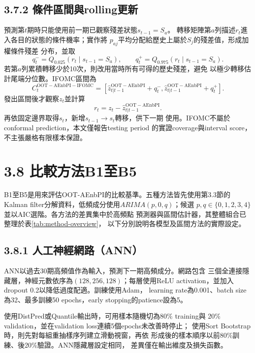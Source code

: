 \subsection*{3.7.2 條件區間與rolling更新}

預測第$t$期時只能使用前一期已觀察殘差狀態$s_{t-1}=S_a$。
轉移矩陣第$a$列描述$r_t$進入各目的狀態的條件機率；實作將
$p_{aj}$平均分配給歷史上屬於$S_j$的殘差值，形成加權條件殘差
分布，並取
\begin{equation}
 q_t^-=Q_{0.025}(r_t\mid s_{t-1}=S_a),\qquad
 q_t^+=Q_{0.975}(r_t\mid s_{t-1}=S_a).
\end{equation}
若第$a$列累積轉移少於10次，則改用當時所有可得的歷史殘差，避免
以極少轉移估計尾端分位數。IFOMC區間為
\begin{equation}
 C_t^{\mathrm{OOT-AEnbPI-IFOMC}}=\left[
 \widehat z_{t|t-1}^{\mathrm{OOT-AEnbPI}}+q_t^-,
 \widehat z_{t|t-1}^{\mathrm{OOT-AEnbPI}}+q_t^+
 \right].
\end{equation}
發出區間後才觀察$z_t$並計算
\begin{equation}
 r_t=z_t-\widehat z_{t|t-1}^{\mathrm{OOT-AEnbPI}}.
\end{equation}
再依固定邊界取得$s_t$，新增$s_{t-1}\rightarrow s_t$轉移，供下一期
使用。IFOMC不屬於conformal prediction，本文僅報告testing period
的實證coverage與interval score，不主張嚴格有限樣本保證。

\section*{3.8 比較方法B1至B5}

B1至B5是用來評估OOT-AEnbPI的比較基準。五種方法皆先使用第3.3節的
Kalman filter分解資料，低頻成分使用$ARIMA(p,0,q)$；候選
$p,q\in\{0,1,2,3,4\}$並以AIC選階。各方法的差異集中於高頻點
預測器與區間估計器，其整體組合已整理於表\ref{tab:method-overview}，
以下分別說明各模型及區間方法的實際設定。

\subsection*{3.8.1 人工神經網路（ANN）}

ANN以過去30期高頻值作為輸入，預測下一期高頻成分。網路包含
三個全連接隱藏層，神經元數依序為$(128,256,128)$；每層使用ReLU
activation，並加入dropout 0.2以降低過度配適。訓練使用Adam，
learning rate為0.001、batch size為32、最多訓練50 epochs，early
stopping的patience設為5。

使用DistPred或Quantile輸出時，可用樣本隨機切為80\% training與
20\% validation，並在validation loss連續5個epochs未改善時停止；
使用Sort Bootstrap時，則先對每組重抽樣序列建立滑動視窗，再依
形成後的樣本順序以前80\%訓練、後20\%驗證。ANN隱藏層設定相同，
差異僅在輸出維度及損失函數。

